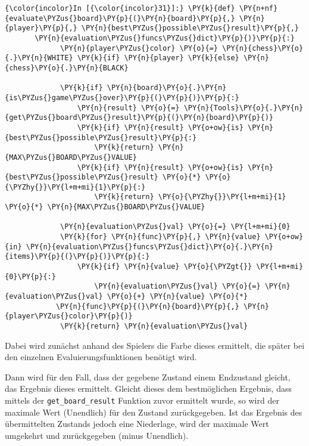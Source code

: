     \begin{Verbatim}[commandchars=\\\{\}]
{\color{incolor}In [{\color{incolor}31}]:} \PY{k}{def} \PY{n+nf}{evaluate\PYZus{}board}\PY{p}{(}\PY{n}{board}\PY{p}{,} \PY{n}{player}\PY{p}{,} \PY{n}{best\PYZus{}possible\PYZus{}result}\PY{p}{,} 
	   \PY{n}{evaluation\PYZus{}funcs\PYZus{}dict}\PY{p}{)}\PY{p}{:}
             \PY{n}{player\PYZus{}color} \PY{o}{=} \PY{n}{chess}\PY{o}{.}\PY{n}{WHITE} \PY{k}{if} \PY{n}{player} \PY{k}{else} \PY{n}{chess}\PY{o}{.}\PY{n}{BLACK}
         
             \PY{k}{if} \PY{n}{board}\PY{o}{.}\PY{n}{is\PYZus{}game\PYZus{}over}\PY{p}{(}\PY{p}{)}\PY{p}{:}
                 \PY{n}{result} \PY{o}{=} \PY{n}{Tools}\PY{o}{.}\PY{n}{get\PYZus{}board\PYZus{}result}\PY{p}{(}\PY{n}{board}\PY{p}{)}
                 \PY{k}{if} \PY{n}{result} \PY{o+ow}{is} \PY{n}{best\PYZus{}possible\PYZus{}result}\PY{p}{:}
                     \PY{k}{return} \PY{n}{MAX\PYZus{}BOARD\PYZus{}VALUE}
                 \PY{k}{if} \PY{n}{result} \PY{o+ow}{is} \PY{n}{best\PYZus{}possible\PYZus{}result} \PY{o}{*} \PY{o}{\PYZhy{}}\PY{l+m+mi}{1}\PY{p}{:}
                     \PY{k}{return} \PY{o}{\PYZhy{}}\PY{l+m+mi}{1} \PY{o}{*} \PY{n}{MAX\PYZus{}BOARD\PYZus{}VALUE}
         
             \PY{n}{evaluation\PYZus{}val} \PY{o}{=} \PY{l+m+mi}{0}
             \PY{k}{for} \PY{n}{func}\PY{p}{,} \PY{n}{value} \PY{o+ow}{in} \PY{n}{evaluation\PYZus{}funcs\PYZus{}dict}\PY{o}{.}\PY{n}{items}\PY{p}{(}\PY{p}{)}\PY{p}{:}
                 \PY{k}{if} \PY{n}{value} \PY{o}{\PYZgt{}} \PY{l+m+mi}{0}\PY{p}{:}
                     \PY{n}{evaluation\PYZus{}val} \PY{o}{=} \PY{n}{evaluation\PYZus{}val} \PY{o}{+} \PY{n}{value} \PY{o}{*} 
			\PY{n}{func}\PY{p}{(}\PY{n}{board}\PY{p}{,} \PY{n}{player\PYZus{}color}\PY{p}{)}
             \PY{k}{return} \PY{n}{evaluation\PYZus{}val}
\end{Verbatim}

    Dabei wird zunächst anhand des Spielers die Farbe dieses ermittelt, die
später bei den einzelnen Evaluierungsfunktionen benötigt wird.

Dann wird für den Fall, dass der gegebene Zustand einem Endzustand
gleicht, das Ergebnis dieses ermittelt. Gleicht dieses dem bestmöglichen
Ergebnis, dass mittels der \texttt{get\_board\_result} Funktion zuvor
ermittelt wurde, so wird der maximale Wert (Unendlich)
für den Zustand zurückgegeben. Ist das Ergebnis des übermittelten
Zustands jedoch eine Niederlage, wird der maximale Wert umgekehrt und
zurückgegeben (minus Unendlich).

